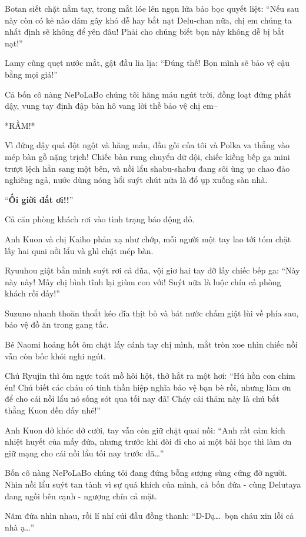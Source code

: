 \documentclass[../main.tex]{subfiles}
\begin{document}
Botan siết chặt nắm tay, trong mắt lóe lên ngọn lửa bảo bọc quyết liệt: ``Nếu sau này còn có kẻ nào dám gây khó dễ hay bắt nạt Delu-chan nữa, chị em chúng ta nhất định sẽ không để yên đâu! Phải cho chúng biết bọn này không dễ bị bắt nạt!''

Lamy cũng quẹt nước mắt, gật đầu lia lịa: ``Đúng thế! Bọn mình sẽ bảo vệ cậu bằng mọi giá!''

Cả bốn cô nàng NePoLaBo chúng tôi hăng máu ngút trời, đồng loạt đứng phắt dậy, vung tay định đập bàn hô vang lời thề bảo vệ chị em--

*RẦM!*

Vì đứng dậy quá đột ngột và hăng máu, đầu gối của tôi và Polka va thẳng vào mép bàn gỗ nặng trịch! Chiếc bàn rung chuyển dữ dội, chiếc kiềng bếp ga mini trượt lệch hẳn sang một bên, và nồi lẩu shabu-shabu đang sôi ùng ục chao đảo nghiêng ngả, nước dùng nóng hổi suýt chút nữa là đổ ụp xuống sàn nhà.

``\textbf{Ối giời đất ơi!!}''

Cả căn phòng khách rơi vào tình trạng báo động đỏ.

Anh Kuon và chị Kaiho phản xạ như chớp, mỗi người một tay lao tới tóm chặt lấy hai quai nồi lẩu và ghì chặt mép bàn.

Ryuuhou giật bắn mình suýt rơi cả đũa, vội giơ hai tay đỡ lấy chiếc bếp ga: ``Này này này! Mấy chị bình tĩnh lại giùm con với! Suýt nữa là luộc chín cả phòng khách rồi đấy!''

Suzuno nhanh thoăn thoắt kéo đĩa thịt bò và bát nước chấm giật lùi về phía sau, bảo vệ đồ ăn trong gang tấc.

Bé Naomi hoảng hốt ôm chặt lấy cánh tay chị mình, mắt tròn xoe nhìn chiếc nồi vẫn còn bốc khói nghi ngút.

Chú Ryujin thì ôm ngực toát mồ hôi hột, thở hắt ra một hơi: ``Hú hồn con chim én! Chú biết các cháu có tinh thần hiệp nghĩa bảo vệ bạn bè rồi, nhưng làm ơn để cho cái nồi lẩu nó sống sót qua tối nay đã! Cháy cái thảm này là chú bắt thằng Kuon đền đấy nhé!''

Anh Kuon dở khóc dở cười, tay vẫn còn giữ chặt quai nồi: ``Anh rất cảm kích nhiệt huyết của mấy đứa, nhưng trước khi đòi đi cho ai một bài học thì làm ơn giữ mạng cho cái nồi lẩu tối nay trước đã\dots''

Bốn cô nàng NePoLaBo chúng tôi đang đứng bỗng sượng sùng cứng đờ người. Nhìn nồi lẩu suýt tan tành vì sự quá khích của mình, cả bốn đứa - cùng Delutaya đang ngồi bên cạnh - ngượng chín cả mặt.

Năm đứa nhìn nhau, rồi lí nhí cúi đầu đồng thanh: ``D-Dạ\dots\ bọn cháu xin lỗi cả nhà ạ\dots''
\end{document}
